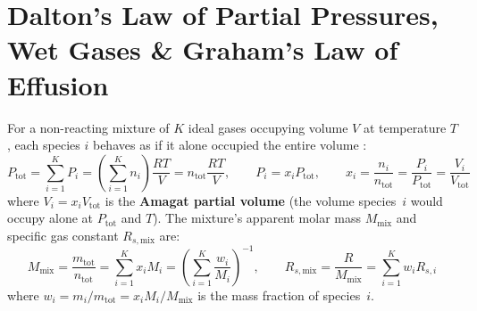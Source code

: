 \section{Dalton's Law of Partial Pressures, Wet Gases \& Graham's Law of Effusion}\label{sec:06.3}

For a non-reacting mixture of $K$ ideal gases occupying volume $V$ at temperature $T$, each species $i$ behaves as if it alone occupied the entire volume :
\begin{equation}\label{eq:06:dalton}
  P_{\mathrm{tot}} = \sum_{i=1}^K P_i = \left(\sum_{i=1}^K n_i\right)\frac{RT}{V} = n_{\mathrm{tot}}\frac{RT}{V}, \qquad P_i = x_i P_{\mathrm{tot}}, \qquad x_i = \frac{n_i}{n_{\mathrm{tot}}} = \frac{P_i}{P_{\mathrm{tot}}} = \frac{V_i}{V_{\mathrm{tot}}}
\end{equation}
where $V_i = x_i V_{\mathrm{tot}}$ is the \textbf{Amagat partial volume} (the volume species~$i$ would occupy alone at $P_{\mathrm{tot}}$ and $T$). The mixture's apparent molar mass $M_{\mathrm{mix}}$ and specific gas constant $R_{s,\mathrm{mix}}$ are:
\begin{equation}\label{eq:06:mmix}
  M_{\mathrm{mix}} = \frac{m_{\mathrm{tot}}}{n_{\mathrm{tot}}} = \sum_{i=1}^K x_i M_i = \left(\sum_{i=1}^K \frac{w_i}{M_i}\right)^{-1}, \qquad R_{s,\mathrm{mix}} = \frac{R}{M_{\mathrm{mix}}} = \sum_{i=1}^K w_i R_{s,i}
\end{equation}
where $w_i = m_i/m_{\mathrm{tot}} = x_i M_i / M_{\mathrm{mix}}$ is the mass fraction of species~$i$.

